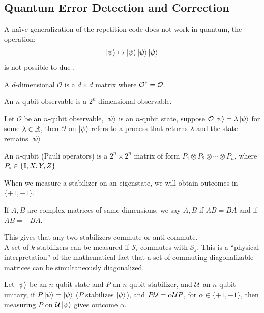 \subsection{Quantum Error Detection and Correction}
A na\"ive generalization of the repetition code does not work in quantum, the operation:
$$\ket{\psi} \mapsto \ket{\psi}\ket{\psi}\ket{\psi}$$
is not possible to due .
\begin{definition}
    A $d$-dimensional  $\mathcal{O}$ is a $d \times d$  matrix where $\mathcal{O}^{\dagger} = \mathcal{O}$.
\end{definition}
An $n$-qubit observable is a $2^n$-dimensional observable.
\begin{definition}
    Let $\mathcal{O}$ be an $n$-qubit observable, $\ket{\psi}$ is an $n$-qubit state, suppose $\mathcal{O}\ket{\psi} = \lambda\ket{\psi}$ for some $\lambda \in \mathbb{R}$, then  $\mathcal{O}$ on $\ket{\psi}$ refers to a process that returns $\lambda$ and the state remains $\ket{\psi}$.
\end{definition}
\begin{definition}
    An $n$-qubit  (Pauli operators) is a $2^n \times 2^n$ matrix of form $P_1 \otimes P_2 \otimes \cdots \otimes P_n$, where $P_i \in \{\mathbb{I}, X, Y, Z\}$
\end{definition}
When we measure a stabilizer on an eigenstate, we will obtain outcomes in $\{+1, -1\}$.
\begin{definition}
    If $A, B$ are complex matrices of same dimensions, we say $A, B$  if $AB = BA$ and  if $AB = -BA$.
\end{definition}
This gives that any two stabilizers commute or anti-commute. \\
A set of $k$ stabilizers can be  measured if $\mathcal{S}_i$ commutes with $\mathcal{S}_j$. This is a ``physical interpretation'' of the mathematical fact that a set of commuting diagonalizable matrices can be simultaneously diagonalized.
\begin{lemma}
    Let $\ket{\psi}$ be an $n$-qubit state and $P$ an $n$-qubit stabilizer, and $\mathcal{U}$ an $n$-qubit unitary, if $P\ket{\psi} = \ket{\psi}$ ($P$ stabilizes $\ket{\psi}$), and $P\mathcal{U} = \alpha \mathcal{U} P$, for $\alpha \in \{+1, -1\}$, then measuring $P$ on $\mathcal{U}\ket{\psi}$ gives outcome $\alpha$.
\end{lemma}

